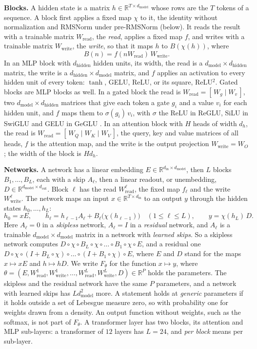 \documentclass[10pt]{article}
\theoremstyle{definition}
\theoremstyle{remark}
\newcommand{\R}{\mathbb{R}}
\newcommand{\Wread}{W_{\mathrm{read}}}
\newcommand{\Wwrite}{W_{\mathrm{write}}}
\newcommand{\dm}{d_{\mathrm{model}}}
\newcommand{\dhid}{d_{\mathrm{hidden}}}
\newcommand{\para}[1]{\smallskip\noindent\textbf{#1}\hspace{0.5em}}
\begin{document}
\para{Blocks.} A hidden state is a matrix $h \in \R^{T\times\dm}$ whose rows are the $T$ tokens of a sequence. A block first applies a fixed map $\chi$ to it, the identity without normalization and RMSNorm under pre-RMSNorm (below). It reads the result with a trainable matrix $\Wread$, the \emph{read}, applies a fixed map $f$, and writes with a trainable matrix $\Wwrite$, the \emph{write}, so that it maps $h$ to $B(\chi(h))$, where
\begin{equation}\label{eq:block}
B(n) = f(n\Wread)\,\Wwrite.
\end{equation}
In an MLP block with $\dhid$ hidden units, its width, the read is a $\dm\times\dhid$ matrix, the write is a $\dhid\times\dm$ matrix, and $f$ applies an activation to every hidden unit of every token: $\tanh$, GELU, ReLU, or its square, ReLU$^2$. Gated blocks are MLP blocks as well. In a gated block the read is $\Wread = [\,W_g \mid W_v\,]$, two $\dm\times\dhid$ matrices that give each token a gate $g_i$ and a value $v_i$ for each hidden unit, and $f$ maps them to $\sigma(g_i)\,v_i$, with $\sigma$ the ReLU in ReGLU, SiLU in SwiGLU and GELU in GeGLU \citep{shazeer2020glu}. In an attention block with $H$ heads of width $d_h$, the read is $\Wread = [\,W_Q \mid W_K \mid W_V\,]$, the query, key and value matrices of all heads, $f$ is the attention map, and the write is the output projection $\Wwrite = W_O$; the width of the block is $Hd_h$.

\para{Networks.} A network has a linear embedding $E \in \R^{d_{\mathrm{in}}\times\dm}$, then $L$ blocks $B_1, \dots, B_L$, each with a skip $A_\ell$, then a linear readout, or unembedding, $D \in \R^{\dm\times d_{\mathrm{out}}}$. Block $\ell$ has the read $\Wread^{\ell}$, the fixed map $f_\ell$ and the write $\Wwrite^{\ell}$. The network maps an input $x \in \R^{T\times d_{\mathrm{in}}}$ to an output $y$ through the hidden states $h_0, \dots, h_L$:
\begin{equation}\label{eq:nets}
h_0 = xE, \qquad h_\ell = h_{\ell-1}A_\ell + B_\ell\big(\chi(h_{\ell-1})\big) \quad (1 \le \ell \le L), \qquad y = \chi(h_L)\,D.
\end{equation}
Here $A_\ell = 0$ in a \emph{skipless} network, $A_\ell = I$ in a \emph{residual} network, and $A_\ell$ is a trainable $\dm\times\dm$ matrix in a network with \emph{learned skips}. So a skipless network computes $D \circ \chi \circ B_L \circ \chi \circ \dots \circ B_1 \circ \chi \circ E$, and a residual one $D \circ \chi \circ (I + B_L \circ \chi) \circ \dots \circ (I + B_1 \circ \chi) \circ E$, where $E$ and $D$ stand for the maps $x \mapsto xE$ and $h \mapsto hD$. We write $F_\theta$ for the function $x \mapsto y$, where $\theta = (E, \Wread^{1}, \Wwrite^{1}, \dots, \Wread^{L}, \Wwrite^{L}, D) \in \R^P$ holds the parameters. The skipless and the residual network have the same $P$ parameters, and a network with learned skips has $L\dm^2$ more. A statement holds at \emph{generic} parameters if it holds outside a set of Lebesgue measure zero, so with probability one for weights drawn from a density. An output function without weights, such as the softmax, is not part of $F_\theta$. A transformer layer has two blocks, its attention and MLP sub-layers: a transformer of $12$ layers has $L = 24$, and \emph{per block} means per sub-layer.
\end{document}
